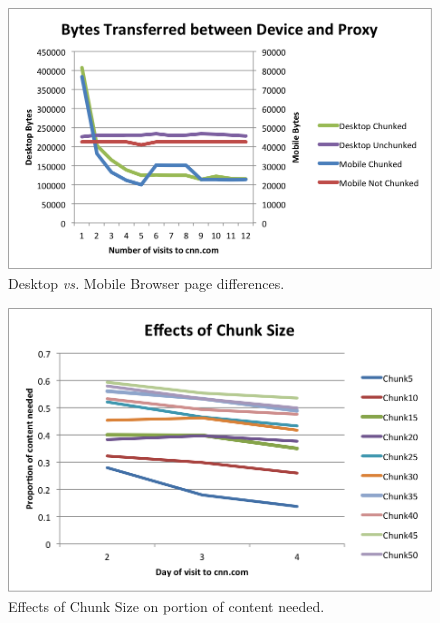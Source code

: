 \begin{figure}[h] 
\centering \includegraphics[width=\columnwidth]{images/desktopmobile.png}
\caption{Desktop \textit{vs.} Mobile Browser page differences.}
\label{fig:desktop_mobile}
\end{figure}

\begin{figure}[h] 
\centering \includegraphics[width=\columnwidth]{images/chunksize.png}
\caption{Effects of Chunk Size on portion of content needed.}
\label{fig:percent_content}
\end{figure}

